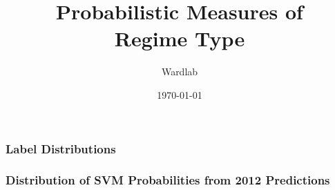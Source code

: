 \documentclass[10pt]{beamer}
\title[Regime Classification \hspace{14em} \insertframenumber/
\inserttotalframenumber]{Probabilistic Measures of \\ Regime Type}
\author{Wardlab}
\institute[Duke University]
{
{\emph{sfm12@duke.edu}} \\
\medskip
Duke University 
}
\date{\today}
\begin{document}
\begin{frame}
\titlepage
\end{frame}

\begin{frame}
\frametitle{Label Distributions}

\begin{figure}[ht]
	\centering
	\resizebox{1\textwidth}{!}{}	
\end{figure}

\end{frame}

\begin{frame}
\frametitle{Distribution of SVM Probabilities from 2012 Predictions}

\begin{figure}[ht]
	\centering
	\resizebox{1\textwidth}{!}{}	
\end{figure}

\end{frame}
\end{document}
